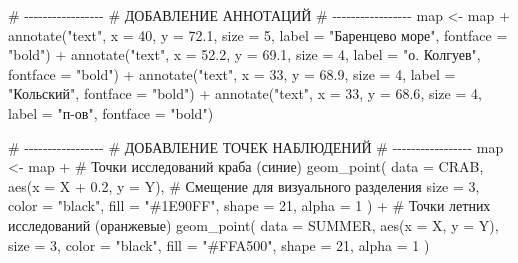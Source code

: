 \documentclass[
  letterpaper,
  DIV=11,
  numbers=noendperiod]{scrreprt}
\newenvironment{Shaded}{\begin{snugshade}}{\end{snugshade}}
\newcommand{\AttributeTok}[1]{\textcolor[rgb]{0.40,0.45,0.13}{#1}}
\newcommand{\CommentTok}[1]{\textcolor[rgb]{0.37,0.37,0.37}{#1}}
\newcommand{\DecValTok}[1]{\textcolor[rgb]{0.68,0.00,0.00}{#1}}
\newcommand{\FloatTok}[1]{\textcolor[rgb]{0.68,0.00,0.00}{#1}}
\newcommand{\FunctionTok}[1]{\textcolor[rgb]{0.28,0.35,0.67}{#1}}
\newcommand{\NormalTok}[1]{\textcolor[rgb]{0.00,0.23,0.31}{#1}}
\newcommand{\OtherTok}[1]{\textcolor[rgb]{0.00,0.23,0.31}{#1}}
\newcommand{\SpecialCharTok}[1]{\textcolor[rgb]{0.37,0.37,0.37}{#1}}
\newcommand{\StringTok}[1]{\textcolor[rgb]{0.13,0.47,0.30}{#1}}
\begin{document}
\begin{Shaded}
\begin{Highlighting}[]
\CommentTok{\# {-}{-}{-}{-}{-}{-}{-}{-}{-}{-}{-}{-}{-}{-}{-}{-}{-}}
\CommentTok{\# ДОБАВЛЕНИЕ АННОТАЦИЙ}
\CommentTok{\# {-}{-}{-}{-}{-}{-}{-}{-}{-}{-}{-}{-}{-}{-}{-}{-}{-}}
\NormalTok{map }\OtherTok{\textless{}{-}}\NormalTok{ map }\SpecialCharTok{+}
  \FunctionTok{annotate}\NormalTok{(}\StringTok{"text"}\NormalTok{, }\AttributeTok{x =} \DecValTok{40}\NormalTok{, }\AttributeTok{y =} \FloatTok{72.1}\NormalTok{, }\AttributeTok{size =} \DecValTok{5}\NormalTok{, }
           \AttributeTok{label =} \StringTok{"Баренцево море"}\NormalTok{, }\AttributeTok{fontface =} \StringTok{"bold"}\NormalTok{) }\SpecialCharTok{+}
  \FunctionTok{annotate}\NormalTok{(}\StringTok{"text"}\NormalTok{, }\AttributeTok{x =} \FloatTok{52.2}\NormalTok{, }\AttributeTok{y =} \FloatTok{69.1}\NormalTok{, }\AttributeTok{size =} \DecValTok{4}\NormalTok{, }
           \AttributeTok{label =} \StringTok{"о. Колгуев"}\NormalTok{, }\AttributeTok{fontface =} \StringTok{"bold"}\NormalTok{) }\SpecialCharTok{+}
  \FunctionTok{annotate}\NormalTok{(}\StringTok{"text"}\NormalTok{, }\AttributeTok{x =} \DecValTok{33}\NormalTok{, }\AttributeTok{y =} \FloatTok{68.9}\NormalTok{, }\AttributeTok{size =} \DecValTok{4}\NormalTok{, }
           \AttributeTok{label =} \StringTok{"Кольский"}\NormalTok{, }\AttributeTok{fontface =} \StringTok{"bold"}\NormalTok{) }\SpecialCharTok{+}
  \FunctionTok{annotate}\NormalTok{(}\StringTok{"text"}\NormalTok{, }\AttributeTok{x =} \DecValTok{33}\NormalTok{, }\AttributeTok{y =} \FloatTok{68.6}\NormalTok{, }\AttributeTok{size =} \DecValTok{4}\NormalTok{, }
           \AttributeTok{label =} \StringTok{"п{-}ов"}\NormalTok{, }\AttributeTok{fontface =} \StringTok{"bold"}\NormalTok{)}

\CommentTok{\# {-}{-}{-}{-}{-}{-}{-}{-}{-}{-}{-}{-}{-}{-}{-}{-}{-}}
\CommentTok{\# ДОБАВЛЕНИЕ ТОЧЕК НАБЛЮДЕНИЙ}
\CommentTok{\# {-}{-}{-}{-}{-}{-}{-}{-}{-}{-}{-}{-}{-}{-}{-}{-}{-}}
\NormalTok{map }\OtherTok{\textless{}{-}}\NormalTok{ map }\SpecialCharTok{+}
  \CommentTok{\# Точки исследований краба (синие)}
  \FunctionTok{geom\_point}\NormalTok{(}
    \AttributeTok{data =}\NormalTok{ CRAB, }
    \FunctionTok{aes}\NormalTok{(}\AttributeTok{x =}\NormalTok{ X }\SpecialCharTok{+} \FloatTok{0.2}\NormalTok{, }\AttributeTok{y =}\NormalTok{ Y), }\CommentTok{\# Смещение для визуального разделения}
    \AttributeTok{size =} \DecValTok{3}\NormalTok{, }\AttributeTok{color =} \StringTok{"black"}\NormalTok{, }\AttributeTok{fill =} \StringTok{"\#1E90FF"}\NormalTok{, }
    \AttributeTok{shape =} \DecValTok{21}\NormalTok{, }\AttributeTok{alpha =} \DecValTok{1}
\NormalTok{  ) }\SpecialCharTok{+}
  \CommentTok{\# Точки летних исследований (оранжевые)}
  \FunctionTok{geom\_point}\NormalTok{(}
    \AttributeTok{data =}\NormalTok{ SUMMER, }
    \FunctionTok{aes}\NormalTok{(}\AttributeTok{x =}\NormalTok{ X, }\AttributeTok{y =}\NormalTok{ Y), }
    \AttributeTok{size =} \DecValTok{3}\NormalTok{, }\AttributeTok{color =} \StringTok{"black"}\NormalTok{, }\AttributeTok{fill =} \StringTok{"\#FFA500"}\NormalTok{, }
    \AttributeTok{shape =} \DecValTok{21}\NormalTok{, }\AttributeTok{alpha =} \DecValTok{1}
\NormalTok{  )}


\end{Highlighting}
\end{Shaded}
\end{document}
